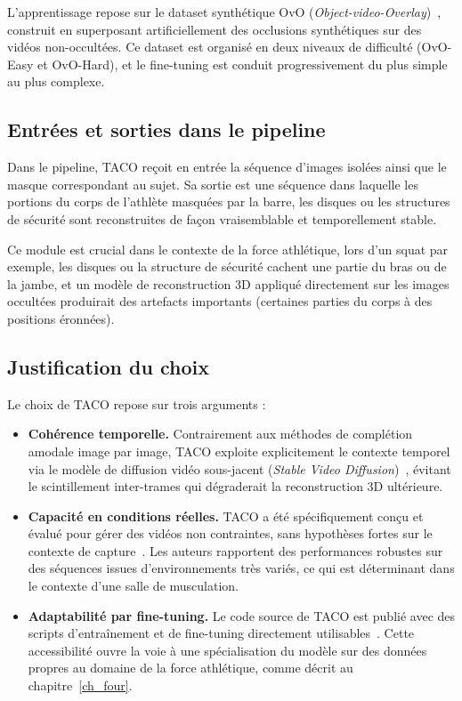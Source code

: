 L'apprentissage repose sur le dataset synthétique OvO (\emph{Object-video-Overlay})~\cite{TACO-2025}, construit en superposant artificiellement des occlusions synthétiques sur des vidéos non-occultées. Ce dataset est organisé en deux niveaux de difficulté (OvO-Easy et OvO-Hard), et le fine-tuning est conduit progressivement du plus simple au plus complexe.

\subsection{Entrées et sorties dans le pipeline}

Dans le pipeline, TACO reçoit en entrée la séquence d'images isolées ainsi que le masque correspondant au sujet. Sa sortie est une séquence dans laquelle les portions du corps de l'athlète masquées par la barre, les disques ou les structures de sécurité sont reconstruites de façon vraisemblable et temporellement stable.

Ce module est crucial dans le contexte de la force athlétique, lors d'un squat par exemple, les disques ou la structure de sécurité cachent une partie du bras ou de la jambe, et un modèle de reconstruction 3D appliqué directement sur les images occultées produirait des artefacts importants (certaines parties du corps à des positions éronnées).

\subsection{Justification du choix}

Le choix de TACO repose sur trois arguments :

\begin{itemize}
  \item \textbf{Cohérence temporelle.} Contrairement aux méthodes de complétion amodale image par image, TACO exploite explicitement le contexte temporel via le modèle de diffusion vidéo sous-jacent (\textit{Stable Video Diffusion})~\cite{TACO-2025}, évitant le scintillement inter-trames qui dégraderait la reconstruction 3D ultérieure.
  \item \textbf{Capacité en conditions réelles.} TACO a été spécifiquement conçu et évalué pour gérer des vidéos non contraintes, sans hypothèses fortes sur le contexte de capture~\cite{TACO-2025}. Les auteurs rapportent des performances robustes sur des séquences issues d'environnements très variés, ce qui est déterminant dans le contexte d'une salle de musculation.
  \item \textbf{Adaptabilité par fine-tuning.} Le code source de TACO est publié avec des scripts d'entraînement et de fine-tuning directement utilisables~\cite{TACO-2025}. Cette accessibilité ouvre la voie à une spécialisation du modèle sur des données propres au domaine de la force athlétique, comme décrit au chapitre~\ref{ch_four}.
\end{itemize}

